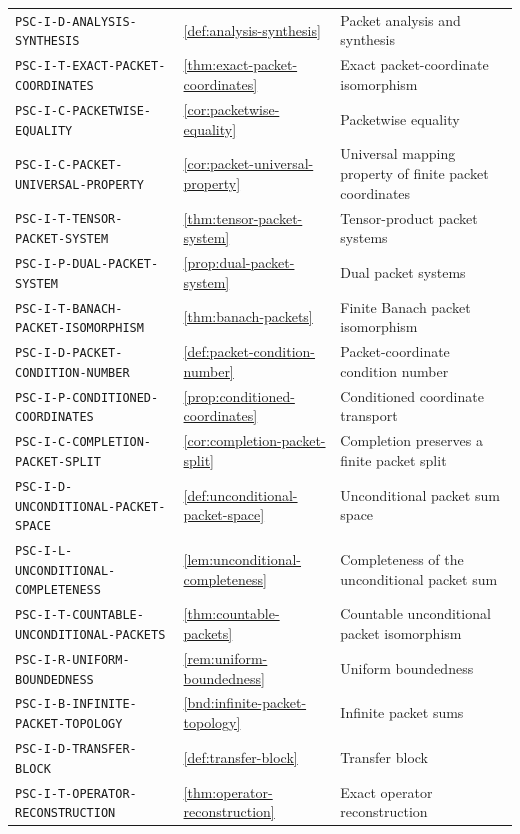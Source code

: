 \documentclass[11pt]{article}
\theoremstyle{definition}
\theoremstyle{remark}
\theoremstyle{definition}\newtheorem{example}[theorem]{Example}
\begin{document}
\begin{longtable}{@{}p{}p{}p{}@{}}
\nolinkurl{PSC-I-D-ANALYSIS-SYNTHESIS} & \ref{def:analysis-synthesis} & Packet analysis and synthesis \\
\nolinkurl{PSC-I-T-EXACT-PACKET-COORDINATES} & \ref{thm:exact-packet-coordinates} & Exact packet-coordinate isomorphism \\
\nolinkurl{PSC-I-C-PACKETWISE-EQUALITY} & \ref{cor:packetwise-equality} & Packetwise equality \\
\nolinkurl{PSC-I-C-PACKET-UNIVERSAL-PROPERTY} & \ref{cor:packet-universal-property} & Universal mapping property of finite packet coordinates \\
\nolinkurl{PSC-I-T-TENSOR-PACKET-SYSTEM} & \ref{thm:tensor-packet-system} & Tensor-product packet systems \\
\nolinkurl{PSC-I-P-DUAL-PACKET-SYSTEM} & \ref{prop:dual-packet-system} & Dual packet systems \\
\nolinkurl{PSC-I-T-BANACH-PACKET-ISOMORPHISM} & \ref{thm:banach-packets} & Finite Banach packet isomorphism \\
\nolinkurl{PSC-I-D-PACKET-CONDITION-NUMBER} & \ref{def:packet-condition-number} & Packet-coordinate condition number \\
\nolinkurl{PSC-I-P-CONDITIONED-COORDINATES} & \ref{prop:conditioned-coordinates} & Conditioned coordinate transport \\
\nolinkurl{PSC-I-C-COMPLETION-PACKET-SPLIT} & \ref{cor:completion-packet-split} & Completion preserves a finite packet split \\
\nolinkurl{PSC-I-D-UNCONDITIONAL-PACKET-SPACE} & \ref{def:unconditional-packet-space} & Unconditional packet sum space \\
\nolinkurl{PSC-I-L-UNCONDITIONAL-COMPLETENESS} & \ref{lem:unconditional-completeness} & Completeness of the unconditional packet sum \\
\nolinkurl{PSC-I-T-COUNTABLE-UNCONDITIONAL-PACKETS} & \ref{thm:countable-packets} & Countable unconditional packet isomorphism \\
\nolinkurl{PSC-I-R-UNIFORM-BOUNDEDNESS} & \ref{rem:uniform-boundedness} & Uniform boundedness \\
\nolinkurl{PSC-I-B-INFINITE-PACKET-TOPOLOGY} & \ref{bnd:infinite-packet-topology} & Infinite packet sums \\
\nolinkurl{PSC-I-D-TRANSFER-BLOCK} & \ref{def:transfer-block} & Transfer block \\
\nolinkurl{PSC-I-T-OPERATOR-RECONSTRUCTION} & \ref{thm:operator-reconstruction} & Exact operator reconstruction \\

\end{longtable}
\end{document}
